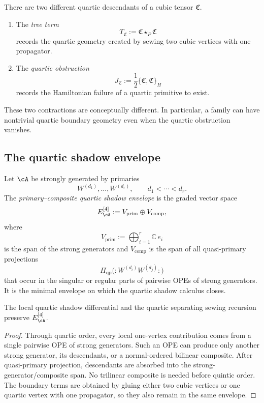 \begin{remark}
\label{rem:nms-tree-vs-obstruction}
There are two different quartic descendants of a cubic tensor $\mathfrak C$.
\begin{enumerate}[label=\textup{(\roman*)}]
\item The \emph{tree term}
\[
T_{\mathfrak C}:=\mathfrak C\star_{P}\mathfrak C
\]
records the quartic geometry created by sewing two cubic vertices with one propagator.
\item The \emph{quartic obstruction}
\[
J_{\mathfrak C}:=\frac12\{\mathfrak C,\mathfrak C\}_{H}
\]
records the Hamiltonian failure of a quartic primitive to exist.
\end{enumerate}
These two contractions are conceptually different. In particular, a family can have nontrivial quartic boundary geometry even when the quartic obstruction vanishes.
\end{remark}

\subsection{The quartic shadow envelope}
\label{subsec:nms-shadow-envelope}

\begin{definition}
\label{def:nms-primary-composite-envelope}
Let $\cA$ be strongly generated by primaries
\[
W^{(d_1)},\dots,W^{(d_r)},\qquad d_1<\cdots<d_r.
\]
The \emph{primary--composite quartic shadow envelope} is the graded vector space
\[
E_{\cA}^{[4]}:=V_{\mathrm{prim}}\oplus V_{\mathrm{comp}},
\]
where
\[
V_{\mathrm{prim}}:=\bigoplus_{i=1}^r \mathbb C\,e_i
\]
is the span of the strong generators and $V_{\mathrm{comp}}$ is the span of all quasi-primary projections
\[
\Pi_{\mathrm{qp}}\bigl(:W^{(d_i)}W^{(d_j)}:\bigr)
\]
that occur in the singular or regular parts of pairwise OPEs of strong generators. It is the minimal envelope on which the quartic shadow calculus closes.
\end{definition}

\begin{proposition}
\label{prop:nms-quartic-closure-envelope}
The local quartic shadow differential and the quartic separating sewing recursion preserve $E_{\cA}^{[4]}$.
\end{proposition}

\begin{proof}
Through quartic order, every local one-vertex contribution comes from a single pairwise OPE of strong generators. Such an OPE can produce only another strong generator, its descendants, or a normal-ordered bilinear composite. After quasi-primary projection, descendants are absorbed into the strong-generator/composite span. No trilinear composite is needed before quintic order. The boundary terms are obtained by gluing either two cubic vertices or one quartic vertex with one propagator, so they also remain in the same envelope.\qedhere
\end{proof}

